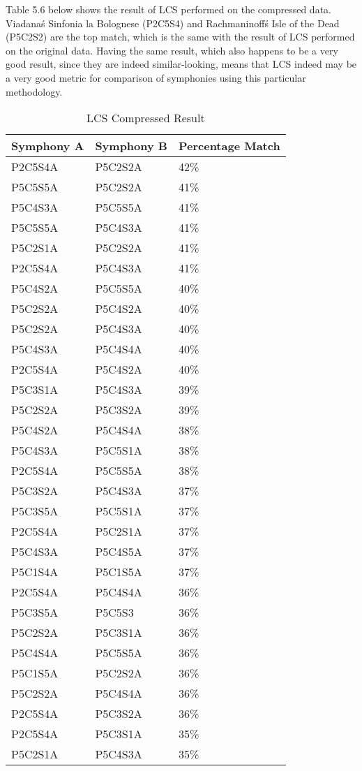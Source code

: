Table 5.6 below shows the result of LCS performed on the compressed data. Viadana\'s Sinfonia la Bolognese (P2C5S4) and Rachmaninoff\'s Isle of the Dead (P5C2S2) are the top match, which is the same with the result of LCS performed on the original data. Having the same result, which also happens to be a very good result, since they are indeed similar-looking, means that LCS indeed may be a very good metric for comparison of symphonies using this particular methodology.

\begin{longtable}{|l|l|l|}
\caption{LCS  Compressed Result}
\label{my-label}\\
\hline
Symphony A & Symphony B & Percentage Match \\ \hline
\endfirsthead
%
\endhead
%
P2C5S4A & P5C2S2A & 42\% \\ \hline
P5C5S5A & P5C2S2A & 41\% \\ \hline
P5C4S3A & P5C5S5A & 41\% \\ \hline
P5C5S5A & P5C4S3A & 41\% \\ \hline
P5C2S1A & P5C2S2A & 41\% \\ \hline
P2C5S4A & P5C4S3A & 41\% \\ \hline
P5C4S2A & P5C5S5A & 40\% \\ \hline
P5C2S2A & P5C4S2A & 40\% \\ \hline
P5C2S2A & P5C4S3A & 40\% \\ \hline
P5C4S3A & P5C4S4A & 40\% \\ \hline
P2C5S4A & P5C4S2A & 40\% \\ \hline
P5C3S1A & P5C4S3A & 39\% \\ \hline
P5C2S2A & P5C3S2A & 39\% \\ \hline
P5C4S2A & P5C4S4A & 38\% \\ \hline
P5C4S3A & P5C5S1A & 38\% \\ \hline
P2C5S4A & P5C5S5A & 38\% \\ \hline
P5C3S2A & P5C4S3A & 37\% \\ \hline
P5C3S5A & P5C5S1A & 37\% \\ \hline
P2C5S4A & P5C2S1A & 37\% \\ \hline
P5C4S3A & P5C4S5A & 37\% \\ \hline
P5C1S4A & P5C1S5A & 37\% \\ \hline
P2C5S4A & P5C4S4A & 36\% \\ \hline
P5C3S5A & P5C5S3 & 36\% \\ \hline
P5C2S2A & P5C3S1A & 36\% \\ \hline
P5C4S4A & P5C5S5A & 36\% \\ \hline
P5C1S5A & P5C2S2A & 36\% \\ \hline
P5C2S2A & P5C4S4A & 36\% \\ \hline
P2C5S4A & P5C3S2A & 36\% \\ \hline
P2C5S4A & P5C3S1A & 35\% \\ \hline
P5C2S1A & P5C4S3A & 35\% \\ \hline
\end{longtable}

